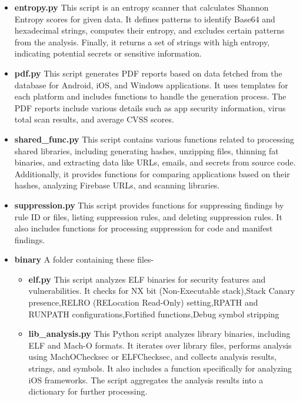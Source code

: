 \documentclass{report}
\begin{document}
\begin{itemize}
\begin{itemize}
\begin{itemize}
                    \item \textbf{entropy.py}
                    This script is an entropy scanner that calculates Shannon Entropy scores for given data. It defines patterns to identify Base64 and hexadecimal strings, computes their entropy, and excludes certain patterns from the analysis. Finally, it returns a set of strings with high entropy, indicating potential secrets or sensitive information.
                    \item \textbf{pdf.py}                    
                    This script generates PDF reports based on data fetched from the database for Android, iOS, and Windows applications. It uses templates for each platform and includes functions to handle the generation process. The PDF reports include various details such as app security information, virus total scan results, and average CVSS scores.
                    \item \textbf {shared\_func.py}
                    This script contains various functions related to processing shared libraries, including generating hashes, unzipping files, thinning fat binaries, and extracting data like URLs, emails, and secrets from source code. Additionally, it provides functions for comparing applications based on their hashes, analyzing Firebase URLs, and scanning libraries.
                    \item \textbf{suppression.py}
                    This script provides functions for suppressing findings by rule ID or files, listing suppression rules, and deleting suppression rules. It also includes functions for processing suppression for code and manifest findings.
                    \item \textbf{binary}
                    \newline A folder containing these files-
                    \begin{itemize}
                        \item \textbf {elf.py}
                        This script analyzes ELF binaries for security features and vulnerabilities. It checks for NX bit (Non-Executable stack),Stack Canary presence,RELRO (RELocation Read-Only) setting,RPATH and RUNPATH configurations,Fortified functions,Debug symbol stripping
                        \item \textbf {lib\_analysis.py}
                        This Python script analyzes library binaries, including ELF and Mach-O formats. It iterates over library files, performs analysis using MachOChecksec or ELFChecksec, and collects analysis results, strings, and symbols. It also includes a function specifically for analyzing iOS frameworks. The script aggregates the analysis results into a dictionary for further processing.

\end{itemize}
\end{itemize}
\end{itemize}
\end{itemize}
\end{document}
